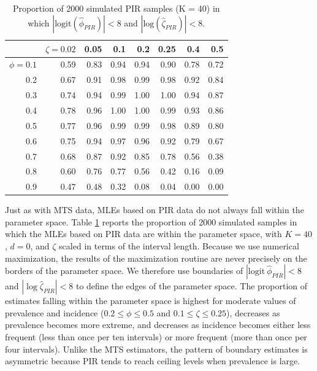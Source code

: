 \documentclass[man, noextraspace, floatsintext]{apa6}\usepackage[]{graphicx}\usepackage[]{color}
\newcommand{\logit}{\text{logit}}
\begin{document}
\begin{table}[b]
\centering
\caption{Proportion of 2000 simulated PIR samples (K = 40) in which  $|\text{logit}(\hat\phi_{PIR})| < 8$ and $|\text{log}(\hat\zeta_{PIR})| < 8$.} 
\label{tab:PIR_ests_valid}
\begin{tabular}{rrrrrrrr}
  \hline
 & $\zeta = 0.02$ & 0.05 & 0.1 & 0.2 & 0.25 & 0.4 & 0.5 \\ 
  \hline
$\phi = 0.1$ & 0.59 & 0.83 & 0.94 & 0.94 & 0.90 & 0.78 & 0.72 \\ 
  0.2 & 0.67 & 0.91 & 0.98 & 0.99 & 0.98 & 0.92 & 0.84 \\ 
  0.3 & 0.74 & 0.94 & 0.99 & 1.00 & 1.00 & 0.94 & 0.87 \\ 
  0.4 & 0.78 & 0.96 & 1.00 & 1.00 & 0.99 & 0.93 & 0.86 \\ 
  0.5 & 0.77 & 0.96 & 0.99 & 0.99 & 0.98 & 0.89 & 0.80 \\ 
  0.6 & 0.75 & 0.94 & 0.97 & 0.96 & 0.92 & 0.79 & 0.67 \\ 
  0.7 & 0.68 & 0.87 & 0.92 & 0.85 & 0.78 & 0.56 & 0.38 \\ 
  0.8 & 0.60 & 0.76 & 0.77 & 0.56 & 0.42 & 0.16 & 0.09 \\ 
  0.9 & 0.47 & 0.48 & 0.32 & 0.08 & 0.04 & 0.00 & 0.00 \\ 
   \hline
\end{tabular}
\end{table}


Just as with MTS data, MLEs based on PIR data do not always fall within the parameter space. 
Table \ref{tab:PIR_ests_valid} reports the proportion of 2000 simulated samples in which the MLEs based on PIR data are within the parameter space, with $K = 40$, $d = 0$, and $\zeta$ scaled in terms of the interval length.
Because we use numerical maximization, the results of the maximization routine are never precisely on the borders of the parameter space. 
We therefore use boundaries of $|\logit \ \hat\phi_{PIR}| < 8$ and $|\log \hat\zeta_{PIR}| < 8$ to define the edges of the parameter space. 
The proportion of estimates falling within the parameter space is highest for moderate values of prevalence and incidence ($0.2 \leq \phi \leq 0.5$ and $0.1 \leq \zeta \leq 0.25$), decreases as prevalence becomes more extreme, and decreases as incidence becomes either less frequent (less than once per ten intervals) or more frequent (more than once per four intervals).  
Unlike the MTS estimators, the pattern of boundary estimates is asymmetric because PIR tends to reach ceiling levels when prevalence is large. 
\end{document}
